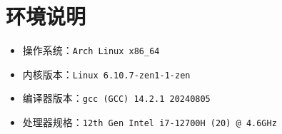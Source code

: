 \section{环境说明}

\begin{itemize}
    \item 操作系统：{\tt Arch Linux x86_64}
    \item 内核版本：{\tt Linux 6.10.7-zen1-1-zen}
    \item 编译器版本：{\tt gcc (GCC) 14.2.1 20240805}
    \item 处理器规格：{\tt 12th Gen Intel i7-12700H (20) @ 4.6GHz}
\end{itemize}
